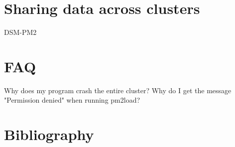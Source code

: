 \documentclass[a4paper,11pt]{article}
\begin{document}
\section{Sharing data across clusters}
        DSM-PM2


\section{FAQ}
        Why does my program crash the entire cluster?
        Why do I get the message "Permission denied" when running pm2load?


\section{Bibliography}
                
\end{document}
